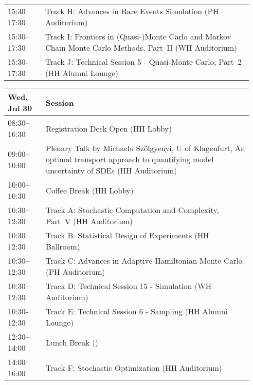 \begin{table}
{\begin{tabularx}{\textwidth}{>{\hsize=0.32\hsize}X|>{\hsize=1.7\hsize}X}
\cellcolor{\SessionTitleColor}15:30–17:30 & \cellcolor{\SessionTitleColor}Track H: Advances in Rare Events Simulation (PH Auditorium) \\
\cellcolor{\SessionTitleColor}15:30–17:30 & \cellcolor{\SessionTitleColor}Track I: Frontiers in (Quasi-)Monte Carlo and Markov Chain Monte Carlo Methods, Part~II (WH Auditorium) \\
\cellcolor{\SessionLightColor}15:30-17:30 & \cellcolor{\SessionLightColor}Track J: Technical Session 5 - Quasi-Monte Carlo, Part~2 (HH Alumni Lounge) \\
\hline
\end{tabularx}
}
\end{table}

\begin{table}
{\footnotesize
\begin{tabularx}{\textwidth}{>{\hsize=0.32\hsize}X|>{\hsize=1.7\hsize}X}
\hline
\textbf{Wed, Jul 30} & \textbf{Session} \\
\hline
\cellcolor{\EmptyColor}08:30–16:30 & \cellcolor{\EmptyColor}Registration Desk Open (HH Lobby) \\
\cellcolor{\PlenaryColor}09:00–10:00 & \cellcolor{\PlenaryColor}Plenary Talk by Michaela Szölgyenyi, U of Klagenfurt, An optimal transport approach to quantifying model uncertainty of SDEs (HH Auditorium) \\
\cellcolor{\EmptyColor}10:00–10:30 & \cellcolor{\EmptyColor}Coffee Break (HH Lobby) \\
\cellcolor{\SessionTitleColor}10:30–12:30 & \cellcolor{\SessionTitleColor}Track A: Stochastic Computation and Complexity, Part~V (HH Auditorium) \\
\cellcolor{\SessionTitleColor}10:30–12:30 & \cellcolor{\SessionTitleColor}Track B: Statistical Design of Experiments (HH Ballroom) \\
\cellcolor{\SessionTitleColor}10:30–12:30 & \cellcolor{\SessionTitleColor}Track C: Advances in Adaptive Hamiltonian Monte Carlo (PH Auditorium) \\
\cellcolor{\SessionLightColor}10:30–12:30 & \cellcolor{\SessionLightColor}Track D: Technical Session 15 - Simulation (WH Auditorium) \\
\cellcolor{\SessionLightColor}10:30-12:30 & \cellcolor{\SessionLightColor}Track E: Technical Session 6 - Sampling (HH Alumni Lounge) \\
\cellcolor{\EmptyColor}12:30–14:00 & \cellcolor{\EmptyColor}Lunch Break () \\
\cellcolor{\SessionTitleColor}14:00–16:00 & \cellcolor{\SessionTitleColor}Track F: Stochastic Optimization (HH Auditorium) \\

\end{tabularx}}
\end{table}
